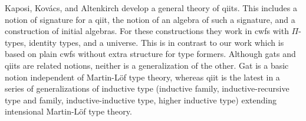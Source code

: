 \documentclass{lmcs}
\begin{document}
%

Kaposi, Kov{\'{a}}cs, and Altenkirch \cite{kaposi:qiits} develop a general theory of qiits. This includes a notion of signature for a qiit, the notion of an algebra of such a signature, and a construction of initial algebras. For these constructions they work in cwfs with $\Pi$-types, identity types, and a universe. This is in contrast to our work which is based on plain cwfs without extra structure for type formers. Although gats and qiits are related notions, neither is a generalization of the other. Gat is a basic notion independent of Martin-Löf type theory, whereas qiit is the latest in a series of generalizations of inductive type (inductive family, inductive-recursive type and family, inductive-inductive type, higher inductive type) extending intensional Martin-Löf type theory.






%
%
\end{document}
